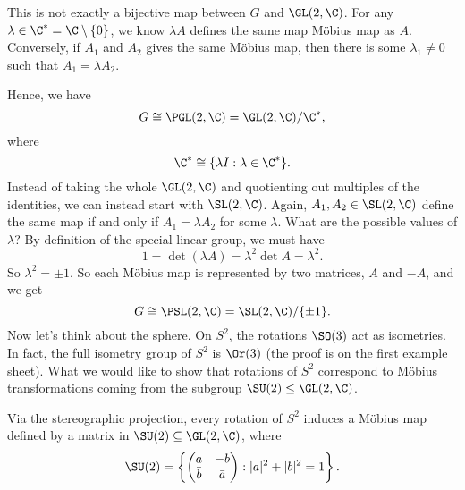 \documentclass[a4paper]{article}
\begin{document}
This is not exactly a bijective map between $G$ and $\GL(2, \C)$. For any $\lambda \in \C^* = \C \setminus \{0\}$, we know $\lambda A$ defines the same map M\"obius map as $A$. Conversely, if $A_1$ and $A_2$ gives the same M\"obius map, then there is some $\lambda_1 \not= 0$ such that $A_1 = \lambda A_2$.

Hence, we have
\[
  G \cong \PGL(2, \C) = \GL(2, \C)/\C^*,
\]
where
\[
  \C^* \cong \{ \lambda I: \lambda \in \C^*\}.
\]
Instead of taking the whole $\GL(2, \C)$ and quotienting out multiples of the identities, we can instead start with $\SL(2, \C)$. Again, $A_1, A_2 \in \SL(2, \C)$ define the same map if and only if $A_1 = \lambda A_2$ for some $\lambda$. What are the possible values of $\lambda$? By definition of the special linear group, we must have
\[
  1 = \det(\lambda A) = \lambda^2 \det A = \lambda^2.
\]
So $\lambda^2 = \pm 1$. So each M\"obius map is represented by two matrices, $A$ and $-A$, and we get
\[
  G \cong \PSL(2, \C) = \SL(2, \C)/\{\pm 1\}.
\]
Now let's think about the sphere. On $S^2$, the rotations $\SO(3)$ act as isometries. In fact, the full isometry group of $S^2$ is $\Or(3)$ (the proof is on the first example sheet). What we would like to show that rotations of $S^2$ correspond to M\"obius transformations coming from the subgroup $\SU(2) \leq \GL(2, \C)$.

\begin{thm}
  Via the stereographic projection, every rotation of $S^2$ induces a M\"obius map defined by a matrix in $\SU(2) \subseteq \GL(2, \C)$, where
  \[
    \SU(2) = \left\{
      \begin{pmatrix}
        a & -b\\
        \bar{b} & \bar{a}
      \end{pmatrix}
      : |a|^2 + |b|^2 = 1
    \right\}.
  \]
\end{thm}
\end{document}
